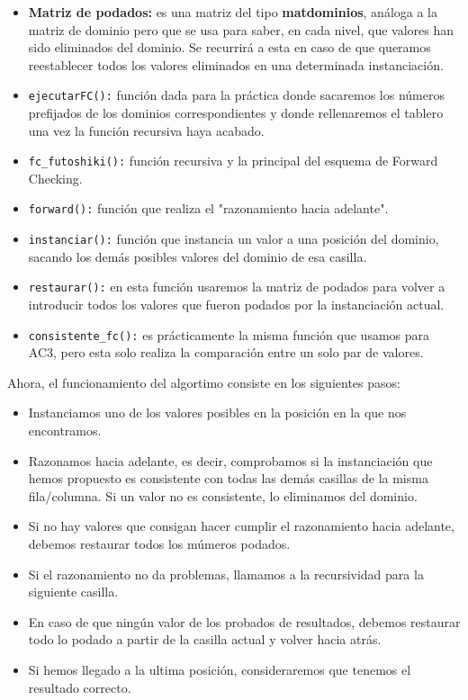 \documentclass[12pt]{article}
\begin{document}
\begin{itemize}
    \item \textbf{Matriz de podados:} es una matriz del tipo \textbf{matdominios}, análoga a la matriz de dominio pero que se usa
        para saber, en cada nivel, que valores han sido eliminados del dominio. Se recurrirá a esta en caso de que queramos reestablecer 
        todos los valores eliminados en una determinada instanciación.
    \item \verb|ejecutarFC():| función dada para la práctica donde sacaremos los números prefijados de los dominios correspondientes y 
        donde rellenaremos el tablero una vez la función recursiva haya acabado.
    \item \verb|fc_futoshiki():| función recursiva y la principal del esquema de Forward Checking. 
    \item \verb|forward():| función que realiza el "razonamiento hacia adelante". 
    \item \verb|instanciar():| función que instancia un valor a una posición del dominio, sacando los demás posibles
        valores del dominio de esa casilla.
    \item \verb|restaurar():| en esta función usaremos la matriz de podados para volver a introducir todos los
        valores que fueron podados por la instanciación actual.
    \item \verb|consistente_fc():| es prácticamente la misma función que usamos para AC3, pero esta solo realiza la comparación
        entre un solo par de valores.     
\end{itemize}

Ahora, el funcionamiento del algortimo consiste en los siguientes pasos: 
\begin{itemize}
    \item Instanciamos uno de los valores posibles en la posición en la que nos encontramos.
    \item Razonamos hacia adelante, es decir, comprobamos si la instanciación que hemos propuesto es consistente
        con todas las demás casillas de la misma fila/columna. Si un valor no es consistente, lo eliminamos del dominio.
    \item Si no hay valores que consigan hacer cumplir el razonamiento hacia adelante, debemos restaurar todos los múmeros podados.
    \item Si el razonamiento no da problemas, llamamos a la recursividad para la siguiente casilla.
    \item En caso de que ningún valor de los probados de resultados, debemos restaurar todo lo podado a partir de la casilla actual y 
        volver hacia atrás.
    \item Si hemos llegado a la ultima posición, consideraremos que tenemos el resultado correcto.
    

\end{itemize}
\end{document}
